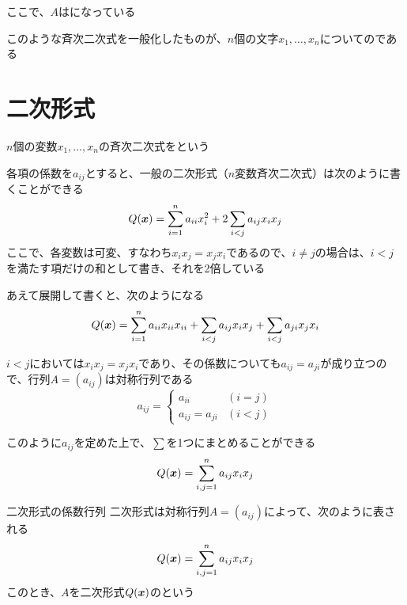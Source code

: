 \documentclass[../../../topic_linear-algebra]{subfiles}
\begin{document}
ここで、$A$はになっている

\br

このような斉次二次式を一般化したものが、$n$個の文字$x_1, \ldots, x_n$についてのである

\sectionline
\section{二次形式}

$n$個の変数$x_1, \ldots, x_n$の斉次二次式をという

\br

各項の係数を$a_{ij}$とすると、一般の二次形式（$n$変数斉次二次式）は次のように書くことができる
\begin{equation*}
  Q(\vb*{x}) = \sum_{i=1}^n a_{ii}x_i^2 + 2 \sum_{i < j} a_{ij}x_ix_j
\end{equation*}
ここで、各変数は可変、すなわち$x_ix_j = x_jx_i$であるので、$i\neq j$の場合は、$i <j$を満たす項だけの和として書き、それを2倍している

\br

あえて展開して書くと、次のようになる
\begin{equation*}
  Q(\vb*{x}) = \sum_{i=1}^n a_{ii}x_{ii}x_{ii} + \sum_{i<j} a_{ij}x_ix_j + \sum_{i<j} a_{ji}x_jx_i
\end{equation*}

\br

$i<j$においては$x_ix_j = x_jx_i$であり、その係数についても$a_{ij} = a_{ji}$が成り立つので、行列$A = (a_{ij})$は対称行列である
\begin{equation*}
  a_{ij} = \begin{cases}
    a_{ii}          & (i = j) \\
    a_{ij} = a_{ji} & (i < j)
  \end{cases}
\end{equation*}

\br

このように$a_{ij}$を定めた上で、$\sum$を1つにまとめることができる
\begin{equation*}
  Q(\vb*{x}) = \sum_{i, j=1}^n a_{ij}x_ix_j
\end{equation*}

\begin{definition}{二次形式の係数行列}
  二次形式は対称行列$A = (a_{ij})$によって、次のように表される
  \begin{equation*}
    Q(\vb*{x}) = \sum_{i, j=1}^n a_{ij}x_ix_j
  \end{equation*}
  このとき、$A$を二次形式$Q(\vb*{x})$のという
\end{definition}
\end{document}
